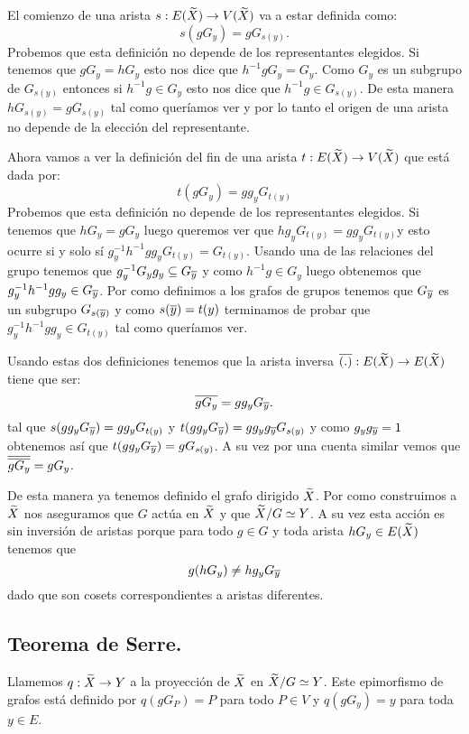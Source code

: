 \documentclass[tesis.tex]{subfiles}
\begin{document}
El comienzo de una arista $s:E(\widetilde X) \to V(\widetilde X)$ va a estar definida como:
\[
s(gG_{y}) = gG_{s(y)}.
\]
Probemos que esta definición no depende de los representantes elegidos.
Si tenemos que $gG_{y} = hG_{y}$ esto nos dice que $h^{-1}gG_{y} = G_{y}$.
Como $G_{y}$ es un subgrupo de $G_{s(y)}$ entonces si $h^{-1}g \in G_y$ esto nos dice que $h^{-1}g \in G_{s(y)}$.
De esta manera $hG_{s(y)} = gG_{s(y)}$ tal como queríamos ver y por lo tanto el origen de una arista no depende de la elección del representante.


Ahora vamos a ver la definición del fin de una arista $t:E(\widetilde X) \to V(\widetilde X)$ que está dada por:
\[
t(gG_{y}) = gg_{y}G_{t(y)}
\]
Probemos que esta definición no depende de los representantes elegidos.
Si tenemos que $hG_{y} = gG_{y}$ luego queremos ver que $hg_{y}G_{t(y)} = gg_{y}G_{t(y)}$y esto ocurre si y solo sí $g^{-1}_y h^{-1}g g_{y} G_{t(y)} = G_{t(y)}$.
Usando una de las relaciones del grupo tenemos que $g_{y}^{-1} G_{y} g_{y} \subseteq G_{\overline y}$ y como $h^{-1}g \in G_{y}$ luego obtenemos que $g^{-1}_y h^{-1}g g_{y} \in G_{\overline y}$.
Por como definimos a los grafos de grupos tenemos que $G_{\overline y}$ es un subgrupo $G_{s(\overline y)}$ y como $s(\overline y) = t(y)$ terminamos de probar que $g^{-1}_y h^{-1}g g_{y} \in G_{t(y)}$ tal como queríamos ver.


Usando estas dos definiciones tenemos que la arista inversa $\overline{(.)}:E(\widetilde X) \to E(\widetilde X)$ tiene que ser:
\[
\overline{gG_{y}} = gg_{y} G_{\overline y}.
\]
tal que $s(gg_{y}G_{\overline y}) = gg_{y}G_{t(y)}$ y $t(gg_{y}G_{\overline y}) = gg_{y}g_{\overline y}G_{s(y)}$ y como $g_{y}g_{\overline y} = 1$ obtenemos así que $t(gg_{y}G_{\overline y}) = gG_{s(y)}$.
A su vez por una cuenta similar vemos que $\overline{\overline{gG_{y}}} = gG_{y}$.

De esta manera ya tenemos definido el grafo dirigido $\widetilde X$.
Por como construimos a $\widetilde X$ nos aseguramos que $G$ actúa en $\widetilde X$ y que $\widetilde X / G \simeq Y$.
A su vez esta acción es sin inversión de aristas porque para todo $g \in G$ y toda arista $hG_{y} \in E(\widetilde X)$ tenemos que
\[
g (hG_{y}) \neq hg_{y}G_{\overline{y}}
\]
dado que son cosets correspondientes a aristas diferentes.

\subsection{Teorema de Serre.}



Llamemos $q:\widetilde X \to Y$ a la proyección de $\widetilde X$ en $\widetilde X / G \simeq Y$.
Este epimorfismo de grafos está definido por 
$q(gG_{P}) = P$ para todo $P \in V$ y 
$q(gG_{y}) = y$ para toda $y \in E$.
\end{document}
